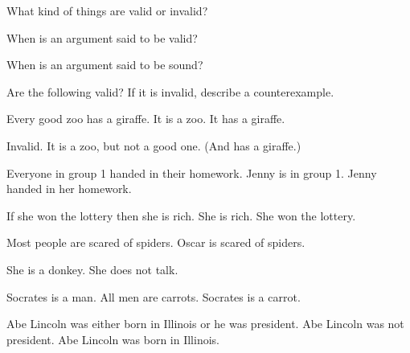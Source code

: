\begin{practiceproblems}
\problempart
\begin{problemslist}
\item What kind of things are valid or invalid?
\item When is an argument said to be valid?
\item When is an argument said to be sound?
\end{problemslist}

\problempart
Are the following valid? If it is invalid, describe a counterexample.
\begin{problemslist}
\item[x.]
\begin{earg}
\prem Every good zoo has a giraffe.
\prem It is a zoo.
\conc It has a giraffe.
\end{earg}
 Invalid. It is a zoo, but not a good one. (And has a giraffe.)

\item
\begin{earg}
\prem Everyone in group 1 handed in their homework.
\prem Jenny is in group 1.
\conc Jenny handed in her homework.
\end{earg}
\item
\begin{earg}
\prem If she won the lottery then she is rich.
\prem She is rich.
\conc She won the lottery.
\end{earg}
\item
\begin{earg}
\prem Most people are scared of spiders.
\conc Oscar is scared of spiders.
\end{earg}
\item
\begin{earg}
\prem She is a donkey.
\conc She does not talk.
\end{earg}


	\item
	\begin{earg}
		\prem Socrates is a man.
		\prem All men are carrots.
		\conc Socrates is a carrot. \hfill {}
	\end{earg}
	
	\item
	\begin{earg}
		\prem Abe Lincoln was either born in Illinois or he was president.
		\prem Abe Lincoln was not president.
		\conc Abe Lincoln was born in Illinois. \hfill \myanswer{Valid}
	\end{earg}
	

\end{problemslist}
\end{practiceproblems}
